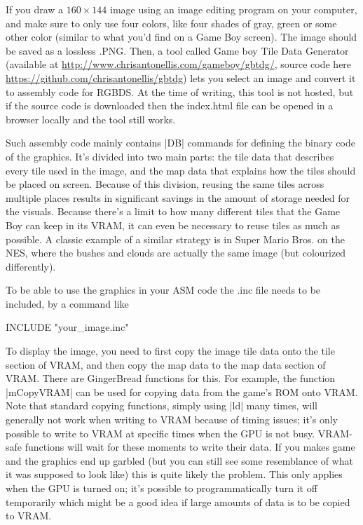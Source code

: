 \documentclass[11pt]{book}
\begin{document}
If you draw a $160\times144$ image using an image editing program on your computer, and make sure to only use four colors, like four shades of gray, green or some other color (similar to what you'd find on a Game Boy screen). The image should be saved as a lossless .PNG. Then, a tool called Game boy Tile Data Generator (available at \url{http://www.chrisantonellis.com/gameboy/gbtdg/}, source code here \url{https://github.com/chrisantonellis/gbtdg}) lets you select an image and convert it to assembly code for RGBDS. At the time of writing, this tool is not hosted, but if the source code is downloaded then the index.html file can be opened in a browser locally and the tool still works.

Such assembly code mainly contains |DB| commands for defining the binary code of the graphics. It's divided into two main parts: the tile data that describes every tile used in the image, and the map data that explains how the tiles should be placed on screen. Because of this division, reusing the same tiles across multiple places results in significant savings in the amount of storage needed for the visuals. Because there's a limit to how many different tiles that the Game Boy can keep in its VRAM, it can even be necessary to reuse tiles as much as possible. A classic example of a similar strategy is in Super Mario Bros. on the NES, where the bushes and clouds are actually the same image (but colourized differently).

To be able to use the graphics in your ASM code the .inc file needs to be included, by a command like

\begin{code}
INCLUDE "your_image.inc"
\end{code}

To display the image, you need to first copy the image tile data onto the tile section of VRAM, and then copy the map data to the map data section of VRAM. There are GingerBread functions for this. For example, the function |mCopyVRAM| can be used for copying data from the game's ROM onto VRAM. Note that standard copying functions, simply using |ld| many times, will generally not work when writing to VRAM because of timing issues; it's only possible to write to VRAM at specific times when the GPU is not busy. VRAM-safe functions will wait for these moments to write their data. If you makes game and the graphics end up garbled (but you can still see some resemblance of what it was supposed to look like) this is quite likely the problem. This only applies when the GPU is turned on; it's possible to programmatically turn it off temporarily which might be a good idea if large amounts of data is to be copied to VRAM.
\end{document}
